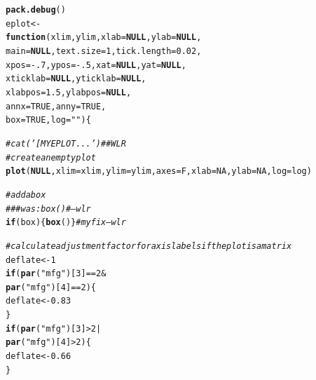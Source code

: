 \documentclass{article}\usepackage[]{graphicx}\usepackage[]{color}
\makeatletter
\newcommand{\hlnum}[1]{\textcolor[rgb]{0.686,0.059,0.569}{#1}}%
\newcommand{\hlstr}[1]{\textcolor[rgb]{0.192,0.494,0.8}{#1}}%
\newcommand{\hlcom}[1]{\textcolor[rgb]{0.678,0.584,0.686}{\textit{#1}}}%
\newcommand{\hlopt}[1]{\textcolor[rgb]{0,0,0}{#1}}%
\newcommand{\hlstd}[1]{\textcolor[rgb]{0.345,0.345,0.345}{#1}}%
\newcommand{\hlkwa}[1]{\textcolor[rgb]{0.161,0.373,0.58}{\textbf{#1}}}%
\newcommand{\hlkwb}[1]{\textcolor[rgb]{0.69,0.353,0.396}{#1}}%
\newcommand{\hlkwc}[1]{\textcolor[rgb]{0.333,0.667,0.333}{#1}}%
\newcommand{\hlkwd}[1]{\textcolor[rgb]{0.737,0.353,0.396}{\textbf{#1}}}%
\newenvironment{kframe}{%
 \def\at@end@of@kframe{}%
 \ifinner\ifhmode%
  \def\at@end@of@kframe{\end{minipage}}%
  \begin{minipage}{\columnwidth}%
 \fi\fi%
 \def\FrameCommand##1{\hskip\@totalleftmargin \hskip-\fboxsep
 \colorbox{shadecolor}{##1}\hskip-\fboxsep
     \hskip-\linewidth \hskip-\@totalleftmargin \hskip\columnwidth}%
 \MakeFramed {\advance\hsize-\width
   \@totalleftmargin\z@ \linewidth\hsize
   \@setminipage}}%
 {\par\unskip\endMakeFramed%
 \at@end@of@kframe}
\newenvironment{knitrout}{}{} %
\makeatother
\begin{document}
\begin{knitrout}\scriptsize
{}\color{fgcolor}\begin{kframe}
\begin{alltt}
\hlkwd{pack.debug}\hlstd{()}
\hlstd{eplot} \hlkwb{<-}
  \hlkwa{function}\hlstd{(}\hlkwc{xlim}\hlstd{,} \hlkwc{ylim}\hlstd{,} \hlkwc{xlab} \hlstd{=} \hlkwa{NULL}\hlstd{,} \hlkwc{ylab} \hlstd{=} \hlkwa{NULL}\hlstd{,}
           \hlkwc{main} \hlstd{=} \hlkwa{NULL}\hlstd{,} \hlkwc{text.size} \hlstd{=} \hlnum{1}\hlstd{,} \hlkwc{tick.length} \hlstd{=} \hlnum{0.02}\hlstd{,}
           \hlkwc{xpos} \hlstd{=} \hlopt{-}\hlnum{.7}\hlstd{,} \hlkwc{ypos} \hlstd{=} \hlopt{-}\hlnum{.5}\hlstd{,} \hlkwc{xat} \hlstd{=} \hlkwa{NULL}\hlstd{,} \hlkwc{yat} \hlstd{=} \hlkwa{NULL}\hlstd{,}
           \hlkwc{xticklab} \hlstd{=} \hlkwa{NULL}\hlstd{,} \hlkwc{yticklab} \hlstd{=} \hlkwa{NULL}\hlstd{,}
           \hlkwc{xlabpos} \hlstd{=} \hlnum{1.5}\hlstd{,} \hlkwc{ylabpos} \hlstd{=} \hlkwa{NULL}\hlstd{,}
           \hlkwc{annx} \hlstd{=} \hlnum{TRUE}\hlstd{,} \hlkwc{anny} \hlstd{=} \hlnum{TRUE}\hlstd{,}
           \hlkwc{box} \hlstd{=} \hlnum{TRUE}\hlstd{,} \hlkwc{log} \hlstd{=} \hlstr{""}\hlstd{) \{}

    \hlcom{#cat('[MYEPLOT... ') ##WLR}
    \hlcom{# create an empty plot}
    \hlkwd{plot}\hlstd{(}\hlkwa{NULL}\hlstd{,} \hlkwc{xlim} \hlstd{= xlim,} \hlkwc{ylim} \hlstd{= ylim,} \hlkwc{axes} \hlstd{= F,} \hlkwc{xlab} \hlstd{=} \hlnum{NA}\hlstd{,} \hlkwc{ylab} \hlstd{=} \hlnum{NA}\hlstd{,} \hlkwc{log} \hlstd{= log)}

    \hlcom{# add a box}
    \hlcom{### was: box() #       ---wlr}
    \hlkwa{if}\hlstd{(box)\{}\hlkwd{box}\hlstd{()\}} \hlcom{# my fix---wlr}

    \hlcom{# calculate adjustment factor for axis labels if the plot is a matrix}
    \hlstd{deflate} \hlkwb{<-} \hlnum{1}
    \hlkwa{if} \hlstd{(}\hlkwd{par}\hlstd{(}\hlstr{"mfg"}\hlstd{)[}\hlnum{3}\hlstd{]} \hlopt{==} \hlnum{2} \hlopt{&}
          \hlkwd{par}\hlstd{(}\hlstr{"mfg"}\hlstd{)[}\hlnum{4}\hlstd{]} \hlopt{==} \hlnum{2}\hlstd{) \{}
      \hlstd{deflate} \hlkwb{<-} \hlnum{0.83}
    \hlstd{\}}
    \hlkwa{if} \hlstd{(}\hlkwd{par}\hlstd{(}\hlstr{"mfg"}\hlstd{)[}\hlnum{3}\hlstd{]} \hlopt{>} \hlnum{2} \hlopt{|}
          \hlkwd{par}\hlstd{(}\hlstr{"mfg"}\hlstd{)[}\hlnum{4}\hlstd{]} \hlopt{>} \hlnum{2}\hlstd{) \{}
      \hlstd{deflate} \hlkwb{<-} \hlnum{0.66}
    \hlstd{\}}


\end{alltt}
\end{kframe}
\end{knitrout}
\end{document}
